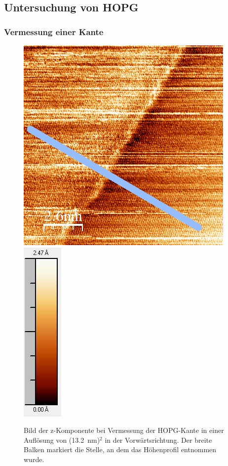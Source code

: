 \documentclass[12pt,a4paper]{article}
\begin{document}
\subsection{Untersuchung von HOPG}
\subsubsection{Vermessung einer Kante}
\begin{figure}
\centering
\includegraphics[scale=0.6]{Bilder/Anhang/Kante/0132_Kante_vor.jpg}
\includegraphics[scale=0.6]{Bilder/Anhang/Kante/0132_Kante_vor_Skala.jpg}
\caption{Bild der z-Komponente bei Vermessung der HOPG-Kante in einer Auflösung von (\SI{13,2}{nm})$^2$ in der Vorwärtsrichtung. Der breite Balken markiert die Stelle, an dem das Höhenprofil entnommen wurde.}
\label{fig:Kante_Beispiel}
\end{figure}
\end{document}

